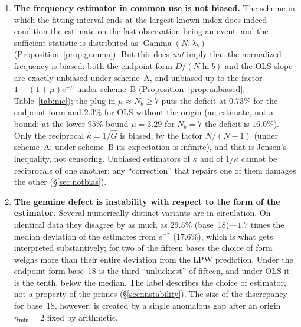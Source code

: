 \documentclass[11pt,a4paper]{article}
\theoremstyle{plain}
\theoremstyle{remark}
\newcommand{\emg}{e^{-\gamma}}
\DeclareMathOperator{\Gam}{Gamma}
\begin{document}
\begin{enumerate}
\item\textbf{The frequency estimator in common use is not biased.} The scheme
in which the fitting interval ends at the largest known index does indeed
condition the estimate on the last observation being an event, and the
sufficient statistic is distributed as $\Gam(N,\lambda_b)$
(Proposition~\ref{prop:gamma}). But this does \emph{not} imply that the
normalized frequency is biased: both the endpoint form $D/(N\ln b)$ and the OLS
slope are exactly unbiased under scheme~A, and unbiased up to the factor
$1-(1+\mu)e^{-\mu}$ under scheme~B (Proposition~\ref{prop:unbiased},
Table~\ref{tab:mc}); the plug-in $\mu\approx N_b\ge7$ puts the deficit at
$0.73\%$ for the endpoint form and $2.3\%$ for OLS without the origin (an
estimate, not a bound: at the lower $95\%$ bound $\mu=3.29$ for $N_b=7$ the
deficit is $16.0\%$).
Only the reciprocal $\hat\kappa=1/\hat G$ is biased, by the factor $N/(N-1)$
(under scheme~A; under scheme~B its expectation is infinite), and that is
Jensen's inequality, not censoring. Unbiased estimators of $\kappa$
and of $1/\kappa$ cannot be reciprocals of one another; any ``correction'' that
repairs one of them damages the other (\S\ref{sec:notbias}).

\item\textbf{The genuine defect is instability with respect to the form of the
estimator.} Several numerically distinct variants are in circulation. On
identical data they disagree by as much as $29.5\%$ (base~18)---$1.7$ times the
median deviation of the estimates from $\emg$ ($17.6\%$), which is what gets
interpreted substantively; for two of the fifteen bases the choice of form
weighs more than their entire deviation from the LPW prediction. Under the
endpoint form base~18 is the third ``unluckiest'' of fifteen, and under OLS it
is the tenth, below the median. The label describes the choice of estimator, not
a property of the primes (\S\ref{sec:instability}). The size of the discrepancy
for base~18, however, is created by a single anomalous gap after an origin
$n_{\min}=2$ fixed by arithmetic.


\end{enumerate}
\end{document}
